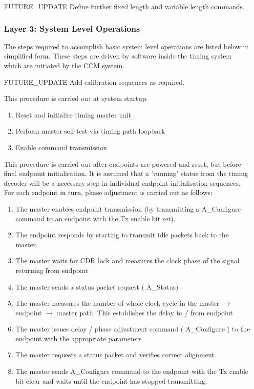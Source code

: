 \documentclass{dune}
\begin{document}
{\color{red}FUTURE\_UPDATE} Define further fixed length and variable length commands.



\subsubsection{Layer 3: System Level Operations}

The steps required to accomplish basic system level operations are listed below in simplified form. These steps are driven by software inside the timing system which are initiated by the CCM system.

{\color{red}FUTURE\_UPDATE} Add calibration sequences as required.


This procedure is carried out at system startup.

\begin{enumerate}
	\item Reset and initialise timing master unit
	\item Perform master self-test via timing path loopback
	\item Enable command transmission
\end{enumerate}


This procedure is carried out after endpoints are powered and reset, but before final endpoint initialisation. It is assumed that a 'running' status from the timing decoder will be a necessary step in individual endpoint initialisation sequences. For each endpoint in turn, phase adjustment is carried out as follows:

\begin{enumerate}
	\item The master enables endpoint transmission (by transmitting a A\_Configure command to an endpoint with the Tx enable bit set). 
	\item The endpoint responds by starting to transmit idle packets back to the master.
	\item The master waits for CDR lock and measures the clock phase of the signal returning from endpoint
	\item The master sends a status packet request ( A\_Status)
	\item The master measures the number of whole clock cycle in the master $\rightarrow$ endpoint $\rightarrow$ master path. This establishes the delay to / from endpoint
	\item The master issues delay / phase adjustment command ( A\_Configure ) to the endpoint with the appropriate parameters
	\item The master requests a status packet and verifies correct alignment.
	\item The master sends A\_Configure command to the endpoint with the Tx enable bit clear and waits until the endpoint has stopped transmitting.
\end{enumerate}
\end{document}

